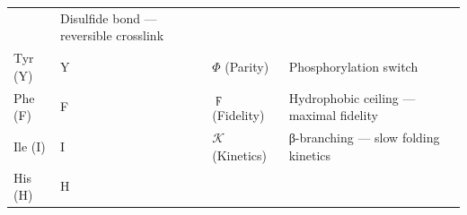 \documentclass[12pt,a4paper]{article}
\begin{document}
\begin{longtable}[]{@{}llll@{}}
\begin{minipage}[t]{0.36\columnwidth}
\end{minipage} & \begin{minipage}[t]{0.15\columnwidth}\raggedright
Disulfide bond --- reversible crosslink\strut
\end{minipage}\tabularnewline
\begin{minipage}[t]{0.20\columnwidth}\raggedright
Tyr (Y)\strut
\end{minipage} & \begin{minipage}[t]{0.17\columnwidth}\raggedright
Y\strut
\end{minipage} & \begin{minipage}[t]{0.36\columnwidth}\raggedright
\(\Phi\) (Parity)\strut
\end{minipage} & \begin{minipage}[t]{0.15\columnwidth}\raggedright
Phosphorylation switch\strut
\end{minipage}\tabularnewline
\begin{minipage}[t]{0.20\columnwidth}\raggedright
Phe (F)\strut
\end{minipage} & \begin{minipage}[t]{0.17\columnwidth}\raggedright
F\strut
\end{minipage} & \begin{minipage}[t]{0.36\columnwidth}\raggedright
\(\digamma\) (Fidelity)\strut
\end{minipage} & \begin{minipage}[t]{0.15\columnwidth}\raggedright
Hydrophobic ceiling --- maximal fidelity\strut
\end{minipage}\tabularnewline
\begin{minipage}[t]{0.20\columnwidth}\raggedright
Ile (I)\strut
\end{minipage} & \begin{minipage}[t]{0.17\columnwidth}\raggedright
I\strut
\end{minipage} & \begin{minipage}[t]{0.36\columnwidth}\raggedright
\(\mathcal{K}\) (Kinetics)\strut
\end{minipage} & \begin{minipage}[t]{0.15\columnwidth}\raggedright
β-branching --- slow folding kinetics\strut
\end{minipage}\tabularnewline
\begin{minipage}[t]{0.20\columnwidth}\raggedright
His (H)\strut
\end{minipage} & \begin{minipage}[t]{0.17\columnwidth}\raggedright
H\strut
\end{minipage} & \begin{minipage}[t]{0.36\columnwidth}\raggedright

\end{minipage}
\end{longtable}
\end{document}
